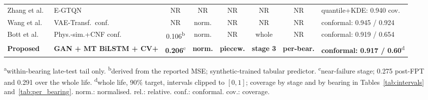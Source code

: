 \begin{table}[!htbp]
\begin{tabular}{llcccccl}
Zhang et al.~\cite{zhang_explainable_2025}     & E-GTQN      & NR & NR & NR & NR & NR & quantile+KDE: 0.940 cov. \\
Wang et al.~\cite{wang_uncertainty-aware_2026} & VAE-Transf.\ conf. & NR & norm. & NR & NR & NR & conformal: 0.945 / 0.924 \\
Bott et al.~\cite{11373138}          & Phys.-sim.+CNF conf. & 0.106\textsuperscript{b} & norm. & NR & whole & NR & conformal: 0.919 / 0.654 \\
\midrule
\rowcolor[RGB]{198,224,180}
\textbf{Proposed} & \textbf{GAN + MT BiLSTM + CV+} &
\textbf{0.206}\textsuperscript{c} & \textbf{norm.} & \textbf{piecew.} &
\textbf{stage 3} & \textbf{per-bear.} & \textbf{conformal: 0.917 / 0.60}\textsuperscript{d} \\
\bottomrule
\end{tabular}

\vspace{3pt}
\raggedright\scriptsize
\textsuperscript{a}within-bearing late-test tail only.
\textsuperscript{b}derived from the reported MSE; synthetic-trained tabular predictor.
\textsuperscript{c}near-failure stage; 0.275 post-FPT and 0.291 over the whole life.
\textsuperscript{d}whole life, 90\% target, intervals clipped to $[0,1]$; coverage by stage and by bearing in Tables~\ref{tab:intervals} and~\ref{tab:per_bearing}.
norm.: normalised. rel.: relative. conf.: conformal. cov.: coverage.
\end{table}
